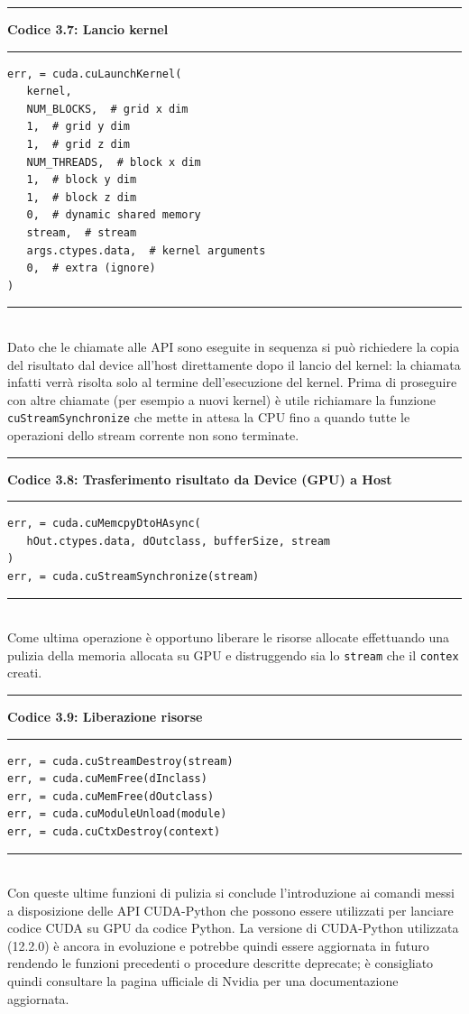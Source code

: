 \documentclass[12pt,a4paper]{report}
\begin{document}
\noindent\rule[0.5ex]{\linewidth}{2pt}
\small{\textbf{Codice 3.7: Lancio kernel}} \\
\noindent\rule[0.5ex]{\linewidth}{1pt}
\begin{lstlisting}
err, = cuda.cuLaunchKernel(
   kernel,
   NUM_BLOCKS,  # grid x dim
   1,  # grid y dim
   1,  # grid z dim
   NUM_THREADS,  # block x dim
   1,  # block y dim
   1,  # block z dim
   0,  # dynamic shared memory
   stream,  # stream
   args.ctypes.data,  # kernel arguments
   0,  # extra (ignore)
)
\end{lstlisting}
\noindent\rule[0.5ex]{\linewidth}{1pt} \\[10pt]
Dato che le chiamate alle API sono eseguite in sequenza si può richiedere la copia del risultato dal device all'host direttamente dopo il lancio del kernel: la chiamata infatti verrà risolta solo al termine dell'esecuzione del kernel. \newline
Prima di proseguire con altre chiamate (per esempio a nuovi kernel) è utile richiamare la funzione \verb|cuStreamSynchronize| che mette in attesa la CPU fino a quando tutte le operazioni dello stream corrente non sono terminate. \newpage

\noindent\rule[0.5ex]{\linewidth}{2pt}
\small{\textbf{Codice 3.8: Trasferimento risultato da Device (GPU) a Host}} \\
\noindent\rule[0.5ex]{\linewidth}{1pt}
\begin{lstlisting}
err, = cuda.cuMemcpyDtoHAsync(
   hOut.ctypes.data, dOutclass, bufferSize, stream
)
err, = cuda.cuStreamSynchronize(stream)
\end{lstlisting}
\noindent\rule[0.5ex]{\linewidth}{1pt} \\[10pt]
Come ultima operazione è opportuno liberare le risorse allocate effettuando una pulizia della memoria allocata su GPU e distruggendo sia lo \verb|stream| che il \verb|contex| creati. \newline

\noindent\rule[0.5ex]{\linewidth}{2pt}
\small{\textbf{Codice 3.9: Liberazione risorse}} \\
\noindent\rule[0.5ex]{\linewidth}{1pt}
\begin{lstlisting}
err, = cuda.cuStreamDestroy(stream)
err, = cuda.cuMemFree(dInclass)
err, = cuda.cuMemFree(dOutclass)
err, = cuda.cuModuleUnload(module)
err, = cuda.cuCtxDestroy(context)
\end{lstlisting}
\noindent\rule[0.5ex]{\linewidth}{1pt} \\[10pt]
Con queste ultime funzioni di pulizia si conclude l'introduzione ai comandi messi a disposizione delle API CUDA-Python che possono essere utilizzati per lanciare codice CUDA su GPU da codice Python. \newline
La versione di CUDA-Python utilizzata (12.2.0) è ancora in evoluzione e potrebbe quindi essere aggiornata in futuro rendendo le funzioni precedenti o procedure descritte deprecate; è consigliato quindi consultare la pagina ufficiale di Nvidia per una documentazione aggiornata. \newpage
\end{document}
